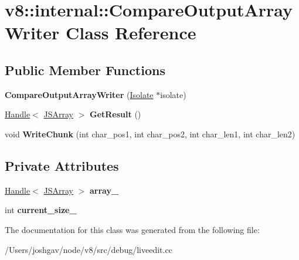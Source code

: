 \hypertarget{classv8_1_1internal_1_1_compare_output_array_writer}{}\section{v8\+:\+:internal\+:\+:Compare\+Output\+Array\+Writer Class Reference}
\label{classv8_1_1internal_1_1_compare_output_array_writer}
\subsection*{Public Member Functions}
\begin{DoxyCompactItemize}
\item 
{\bfseries Compare\+Output\+Array\+Writer} (\hyperlink{classv8_1_1internal_1_1_isolate}{Isolate} $\ast$isolate)\hypertarget{classv8_1_1internal_1_1_compare_output_array_writer_a737c1515098817584e9e10c7fb77f09c}{}\label{classv8_1_1internal_1_1_compare_output_array_writer_a737c1515098817584e9e10c7fb77f09c}

\item 
\hyperlink{classv8_1_1internal_1_1_handle}{Handle}$<$ \hyperlink{classv8_1_1internal_1_1_j_s_array}{J\+S\+Array} $>$ {\bfseries Get\+Result} ()\hypertarget{classv8_1_1internal_1_1_compare_output_array_writer_ac19f607dc9c18b1d3b0828cabfee8c6c}{}\label{classv8_1_1internal_1_1_compare_output_array_writer_ac19f607dc9c18b1d3b0828cabfee8c6c}

\item 
void {\bfseries Write\+Chunk} (int char\+\_\+pos1, int char\+\_\+pos2, int char\+\_\+len1, int char\+\_\+len2)\hypertarget{classv8_1_1internal_1_1_compare_output_array_writer_a3e5e5b33af60cec3f3da87f24703fe5f}{}\label{classv8_1_1internal_1_1_compare_output_array_writer_a3e5e5b33af60cec3f3da87f24703fe5f}

\end{DoxyCompactItemize}
\subsection*{Private Attributes}
\begin{DoxyCompactItemize}
\item 
\hyperlink{classv8_1_1internal_1_1_handle}{Handle}$<$ \hyperlink{classv8_1_1internal_1_1_j_s_array}{J\+S\+Array} $>$ {\bfseries array\+\_\+}\hypertarget{classv8_1_1internal_1_1_compare_output_array_writer_a91f9082e11455b5d5de7cb14e85fd2c1}{}\label{classv8_1_1internal_1_1_compare_output_array_writer_a91f9082e11455b5d5de7cb14e85fd2c1}

\item 
int {\bfseries current\+\_\+size\+\_\+}\hypertarget{classv8_1_1internal_1_1_compare_output_array_writer_ab6791387c96e55c41c47ea6409b93ad1}{}\label{classv8_1_1internal_1_1_compare_output_array_writer_ab6791387c96e55c41c47ea6409b93ad1}

\end{DoxyCompactItemize}


The documentation for this class was generated from the following file\+:\begin{DoxyCompactItemize}
\item 
/\+Users/joshgav/node/v8/src/debug/liveedit.\+cc\end{DoxyCompactItemize}
